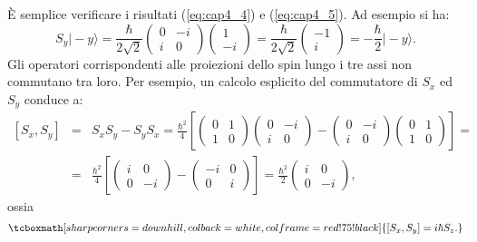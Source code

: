 È semplice verificare i risultati (\ref{eq:cap4_4}) e (\ref{eq:cap4_5}). Ad esempio si ha:
	\begin{equation}
		S_y \vert - y \rangle = \frac{\hbar}{2\sqrt{2}}\begin{pmatrix}
		0 & -i\\
		i & 0
		\end{pmatrix}
		\begin{pmatrix}
		1\\-i
		\end{pmatrix} = \frac{\hbar}{2\sqrt{2}} 
		\begin{pmatrix}
		-1 \\ i
		\end{pmatrix} = -\frac{\hbar}{2} \vert -y \rangle .
	\end{equation}
Gli operatori corrispondenti alle proiezioni dello spin lungo i tre assi non commutano tra loro. Per esempio, un calcolo esplicito del commutatore di $S_x$ ed $S_y$ conduce a:
	\begin{eqnarray}
		\left[ S_x , S_y \right] & = & S_x S_y-S_y S_x= 
		\frac{\hbar ^2}{4} \left[\begin{pmatrix}
		0 & 1\\
		1 & 0
		\end{pmatrix} \begin{pmatrix}
		0 & -i\\
		i & 0
		\end{pmatrix}- \begin{pmatrix}
		0 & -i\\
		i & 0
		\end{pmatrix}\begin{pmatrix}
		0 & 1\\
		1 & 0
		\end{pmatrix}
		\right] = \nonumber \\
		& = &\frac{\hbar ^2}{4} \left[\begin{pmatrix}
		i & 0\\
		0 & -i
		\end{pmatrix} - \begin{pmatrix}
		-i & 0\\
		0 & i
		\end{pmatrix}\right] = 	
		\frac{\hbar ^2}{2}\begin{pmatrix}
		i & 0\\
		0 & -i
		\end{pmatrix},
	\end{eqnarray}
ossia
	\begin{equation}
		\tcboxmath[sharp corners=downhill ,colback=white,colframe=red!75!black]{
			\left[ S_x, S_y \right] = i \hbar S_z.
			}
	\end{equation}
